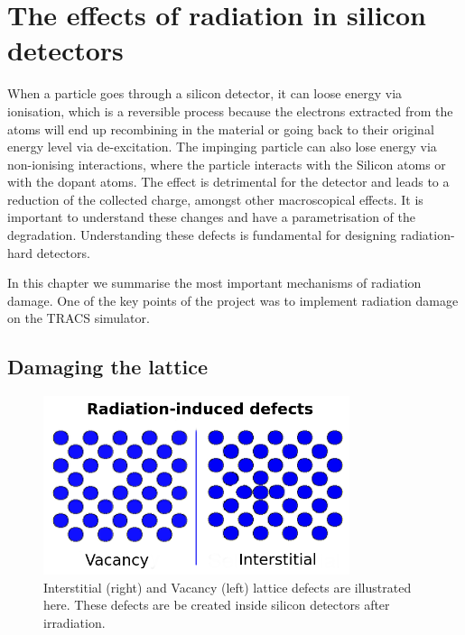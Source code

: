 \clearpage
{}  %
\chapter{The effects of radiation in silicon detectors}%
\label{chap:rad}

When a particle goes through a silicon detector, it can loose energy via ionisation, which is a reversible process because the electrons extracted from the atoms will end up recombining in the material or going back to their original energy level via de-excitation. The impinging particle can also lose energy via non-ionising interactions, where the particle interacts with the Silicon atoms or with the dopant atoms. The effect is detrimental for the detector and leads to a reduction of the collected charge, amongst other macroscopical effects. It is important to understand these changes and have a parametrisation of the degradation. Understanding these defects is fundamental for designing radiation-hard detectors.

In this chapter we summarise the most important mechanisms of radiation damage. One of the key points of the project was to implement radiation damage on the TRACS simulator.


\section{Damaging the lattice}%

\begin{figure}[H]
	\centering
	\includegraphics[width=0.8\textwidth]{chap3_defects.png}
	\caption{Interstitial (right) and Vacancy (left) lattice defects are illustrated here. These defects are be created inside silicon detectors after irradiation.}
	\label{fig:IV}
\end{figure}

